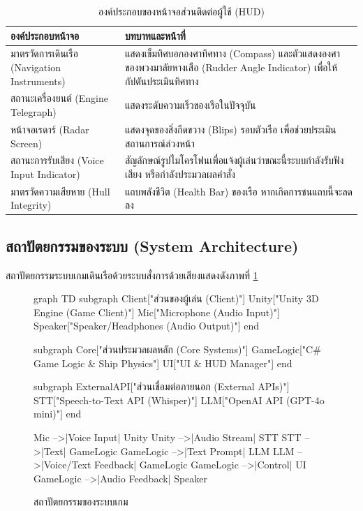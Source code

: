 \begin{table}[H]
\centering
\caption{องค์ประกอบของหน้าจอส่วนติดต่อผู้ใช้ (HUD)}
\label{tab:hud}
\begin{tabular}{|p{4.5cm}|p{9.2cm}|}
\hline
\textbf{องค์ประกอบหน้าจอ} & \textbf{บทบาทและหน้าที่} \\
\hline
มาตรวัดการเดินเรือ (Navigation Instruments) & แสดงเข็มทิศบอกองศาทิศทาง (Compass) และตัวแสดงองศาของพวงมาลัยหางเสือ (Rudder Angle Indicator) เพื่อให้กัปตันประเมินทิศทาง \\ \hline
สถานะเครื่องยนต์ (Engine Telegraph) & แสดงระดับความเร็วของเรือในปัจจุบัน \\ \hline
หน้าจอเรดาร์ (Radar Screen) & แสดงจุดของสิ่งกีดขวาง (Blips) รอบตัวเรือ เพื่อช่วยประเมินสถานการณ์ล่วงหน้า \\ \hline
สถานะการรับเสียง (Voice Input Indicator) & สัญลักษณ์รูปไมโครโฟนเพื่อแจ้งผู้เล่นว่าขณะนี้ระบบกำลังรับฟังเสียง หรือกำลังประมวลผลคำสั่ง \\ \hline
มาตรวัดความเสียหาย (Hull Integrity) & แถบพลังชีวิต (Health Bar) ของเรือ หากเกิดการชนแถบนี้จะลดลง \\
\hline
\end{tabular}
\end{table}

\pagebreak
\subsection{สถาปัตยกรรมของระบบ (System Architecture)}

สถาปัตยกรรมระบบเกมเดินเรือด้วยระบบสั่งการด้วยเสียงแสดงดังภาพที่ \ref{fig:architecture}

\begin{figure}[H]
\centering
\begin{mermaid}
graph TD
    subgraph Client["ส่วนของผู้เล่น (Client)"]
        Unity["Unity 3D Engine (Game Client)"]
        Mic["Microphone (Audio Input)"]
        Speaker["Speaker/Headphones (Audio Output)"]
    end

    subgraph Core["ส่วนประมวลผลหลัก (Core Systems)"]
        GameLogic["C# Game Logic & Ship Physics"]
        UI["UI & HUD Manager"]
    end

    subgraph ExternalAPI["ส่วนเชื่อมต่อภายนอก (External APIs)"]
        STT["Speech-to-Text API (Whisper)"]
        LLM["OpenAI API (GPT-4o mini)"]
    end

    Mic -->|Voice Input| Unity
    Unity -->|Audio Stream| STT
    STT -->|Text| GameLogic
    GameLogic -->|Text Prompt| LLM
    LLM -->|Voice/Text Feedback| GameLogic
    GameLogic -->|Control| UI
    GameLogic -->|Audio Feedback| Speaker
\end{mermaid}
\caption{สถาปัตยกรรมของระบบเกม}
\label{fig:architecture}
\end{figure}

